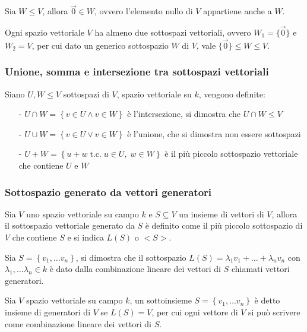 \documentclass[a4paper]{article}
\newcommand\tc{\;\text{t.c.}\;} %
\begin{document}
Sia \(W \leq V\), allora \(\vec{0} \in W\), ovvero l'elemento nullo di \(V\) appartiene anche a \(W\).

Ogni spazio vettoriale \(V\) ha almeno due sottospazi vettoriali, ovvero \(W_1 = \{ \vec{0} \}\) e \(W_2 = V\), per cui
dato un generico sottospazio \(W\) di \(V\), vale \(\{ \vec{0} \} \leq W \leq V\).

\subsubsection*{Unione, somma e intersezione tra sottospazi vettoriali}
Siano \(U, W \leq V\) sottospazi di \(V\), spazio vettoriale su \(k\), vengono definite:
\begin{itemize}[topsep=3pt, itemsep=0pt]
	\item[-] \(U \cap W = \left\{ v \in U \land v \in W \right\}\) è l'intersezione, si dimostra che \(U \cap W \leq V\)
	\item[-] \(U \cup W = \left\{ v \in U \lor v \in W \right\}\) è l'unione, che si dimostra non essere sottospazi
	\item[-] \(U + W = \left\{ u + w \tc u \in U, \; w \in W\right\}\) è il più piccolo sottospazio vettoriale che
	contiene \(U\) e \(W\)
\end{itemize}

\subsubsection*{Sottospazio generato da vettori generatori}
Sia \(V\) uno spazio vettoriale su campo \(k\) e \(S \subseteq V\) un insieme di vettori di \(V\), allora il sottospazio vettoriale
generato da \(S\) è definito come il più piccolo sottospazio di \(V\) che contiene \(S\) e si indica \(L(S)\) o \(<S>\).

Sia \(S = \left\{ v_1, \dots v_n \right\}\), si dimostra che il sottospazio \(L(S) = \lambda_1 v_1 + \dots + \lambda_n v_n\) con
\(\lambda_1, \dots \lambda_n \in k\) è dato dalla combinazione lineare dei vettori di \(S\) chiamati vettori generatori.

Sia \(V\) spazio vettoriale su campo \(k\), un sottoinsieme \(S = \left\{ v_1, \dots v_n \right\}\) è detto insieme di generatori
di \(V\) se \(L(S) = V\), per cui ogni vettore di \(V\) si può scrivere come combinazione lineare dei vettori di \(S\).

\newpage
\end{document}
